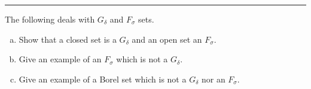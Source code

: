 \documentclass[letterpaper, 12pt]{article}
\begin{document}
\noindent\rule{7in}{2.8pt}
\begin{problem}{1.13}
The following deals with \(G_\delta\) and \(F_\sigma\) sets. 
\begin{enumerate}[(a)]
  \item Show that a closed set is a \(G_\delta\) and an open set an \(F_\sigma\). 
  \item Give an example of an \(F_\sigma\) which is not a \(G_\delta\).
  \item Give an example of a Borel set which is not a \(G_\delta\) nor an \(F_\sigma\). 
\end{enumerate}
\end{problem}
\end{document}
